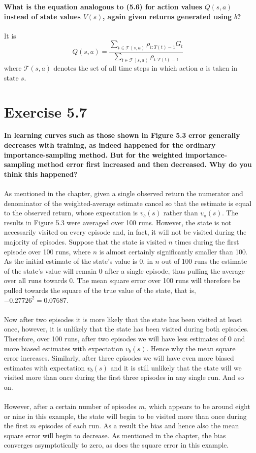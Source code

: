 \documentclass[a4paper,11pt]{article}
\numberwithin{equation}{section}
\theoremstyle{remark}
\begin{document}
\textbf{What is the equation analogous to (5.6) for action values $Q(s, a)$ instead of state values $V(s)$, again given returns generated using $b$?}
\\ \\
It is 
\[
	Q(s, a) = \frac{\sum_{t \in \mathcal{T}(s, a)} \rho_{t:T(t) - 1} G_t}{{\sum_{t \in \mathcal{T}(s, a)} \rho_{t:T(t) - 1}}}
\]
where $\mathcal{T}(s, a)$ denotes the set of all time steps in which action $a$ is taken in state $s$.

\section{Exercise 5.7}

\textbf{In learning curves such as those shown in Figure 5.3 error generally decreases with training, as indeed happened for the ordinary importance-sampling method. But for the weighted importance-sampling method error first increased and then decreased. Why do you think this happened?}
\\ \\
As mentioned in the chapter, given a single observed return the numerator and denominator of the weighted-average estimate cancel so that the estimate is equal to the observed return, whose expectation is $v_b(s)$ rather than $v_\pi(s)$. The results in Figure 5.3 were averaged over 100 runs. However, the state is not necessarily visited on every episode and, in fact, it will not be visited during the majority of episodes. Suppose that the state is visited $n$ times during the first episode over 100 runs, where $n$ is almost certainly significantly smaller than 100. As the initial estimate of the state's value is 0, in $n$ out of 100 runs the estimate of the state's value will remain 0 after a single episode, thus pulling the average over all runs towards 0. The mean square error over 100 runs will therefore be pulled towards the square of the true value of the state, that is, $-0.27726^2 = 0.07687$.
\\ \\
Now after two episodes it is more likely that the state has been visited at least once, however, it is unlikely that the state has been visited during both episodes. Therefore, over 100 runs, after two episodes we will have less estimates of 0 and more biased estimates with expectation $v_b(s)$. Hence why the mean square error increases. Similarly, after three episodes we will have even more biased estimates with expectation $v_b(s)$ and it is still unlikely that the state will we visited more than once during the first three episodes in any single run. And so on. 
\\ \\
However, after a certain number of episodes $m$, which appears to be around eight or nine in this example, the state will begin to be visited more than once during the first $m$ episodes of each run. As a result the bias and hence also the mean square error will begin to decrease. As mentioned in the chapter, the bias converges asymptotically to zero, as does the square error in this example. 
\end{document}

